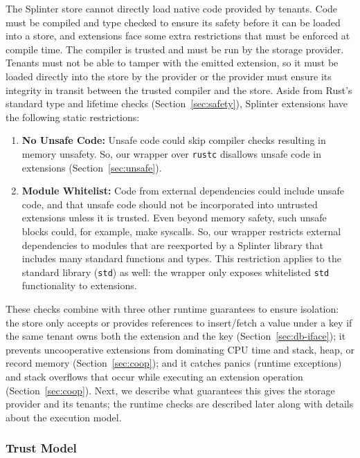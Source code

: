 The Splinter store cannot directly load native code provided by tenants.
Code must be compiled and type checked to ensure its safety before it can be
  loaded into a store, and extensions face some extra restrictions that must be
  enforced at compile time.
The compiler is trusted and must be run by the storage provider.
Tenants must not be able to tamper with the emitted extension, so it must be
  loaded directly into the store by the provider or the provider must
  ensure its integrity in transit between the trusted compiler and the store.
Aside from Rust's standard type and lifetime checks (Section~\ref{sec:safety}),
  Splinter extensions have the following static restrictions:
  \begin{enumerate}
    \item {\bf No Unsafe Code:}
      Unsafe code could skip compiler checks resulting in memory unsafety.
      So, our wrapper over \texttt{rustc} disallows unsafe code in extensions
      (Section~\ref{sec:unsafe}).
    \item {\bf Module Whitelist:}
      Code from external dependencies could include unsafe code, and that
        unsafe code should not be incorporated into untrusted extensions unless it
        is trusted.
      Even beyond memory safety, such unsafe blocks could, for example, make
        syscalls.
      So, our wrapper restricts external dependencies to modules that are
        reexported by a Splinter library that includes many standard functions
        and types.
      This restriction applies to the standard library (\texttt{std}) as well: the
        wrapper only exposes whitelisted \texttt{std} functionality to extensions.
  \end{enumerate}
These checks combine with three other runtime guarantees to
  ensure isolation:
the store only accepts or provides references to insert/fetch a value under a key
  if the same tenant owns both the extension and the key (Section~\ref{sec:db-iface});
it prevents uncooperative extensions from dominating CPU time and stack,
heap, or record memory (Section~\ref{sec:coop}); and
it catches panics (runtime exceptions) and stack overflows that occur while executing an
  extension operation (Section~\ref{sec:coop}).
Next, we describe what guarantees this gives the storage provider and its tenants;
  the runtime checks are described later along with details about the execution model.

\subsubsection{Trust Model}
\label{sec:trust}

